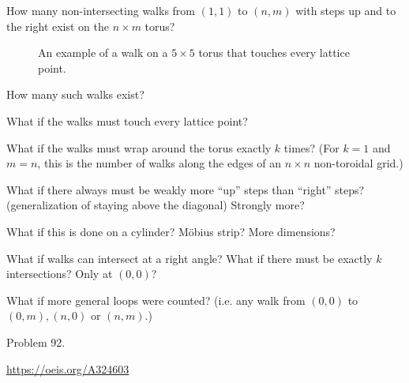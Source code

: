 \documentclass{article}
\begin{document}
  How many non-intersecting walks from $(1,1)$ to $(n, m)$ with steps up and to
  the right exist on the $n \times m$ torus?
\begin{figure}[ht!]
  \centering
  \caption{An example of a walk on a $5 \times 5$ torus that touches every lattice point.}
\end{figure}

\begin{question}
  How many such walks exist?
\end{question}

\begin{related}
  \item What if the walks must touch every lattice point?
  \item What if the walks must wrap around the torus exactly $k$ times?
  (For $k = 1$ and $m = n$, this is the number of walks along the edges of an
  $n \times n$ non-toroidal grid.)
  \item What if there always must be weakly more ``up'' steps than ``right''
    steps? (generalization of staying above the diagonal) Strongly more?
  \item What if this is done on a cylinder? M\"obius strip? More dimensions?
  \item What if walks can intersect at a right angle? What if there must be
  exactly $k$ intersections? Only at $(0,0)$?
  \item What if more general loops were counted?
    (i.e. any walk from $(0,0)$ to $(0,m), (n,0)$ or $(n,m)$.)
\end{related}

\begin{references}
  \item Problem 92.
  \item \url{https://oeis.org/A324603}
\end{references}
\end{document}
